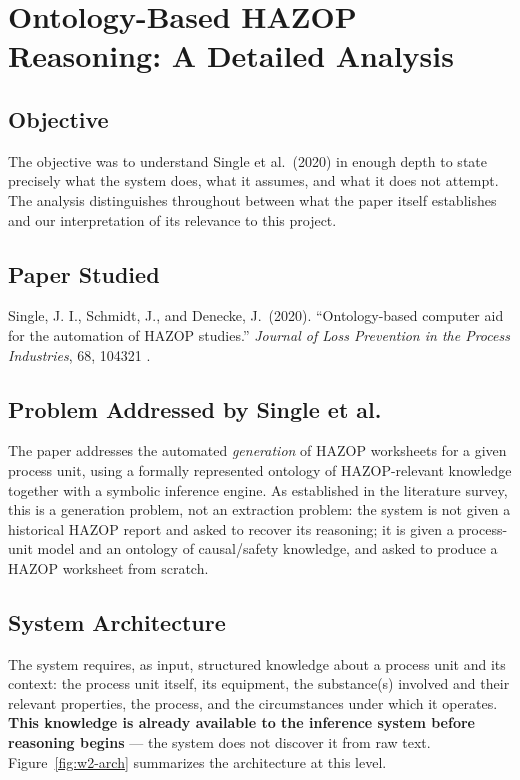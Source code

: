 %

\chapter[Ontology-Based HAZOP Reasoning]{Ontology-Based HAZOP Reasoning: A Detailed Analysis}

\section{Objective}
The objective was to understand Single et al.\ (2020) in enough depth to state precisely what the system does, what it assumes, and what it does not attempt. The analysis distinguishes throughout between what the paper itself establishes and our interpretation of its relevance to this project.

\section{Paper Studied}
Single, J. I., Schmidt, J., and Denecke, J.\ (2020). ``Ontology-based computer aid for the automation of HAZOP studies.'' \emph{Journal of Loss Prevention in the Process Industries}, 68, 104321 \cite{single2020ontologyhazop}.

\section{Problem Addressed by Single et al.}
The paper addresses the automated \emph{generation} of HAZOP worksheets for a given process unit, using a formally represented ontology of HAZOP-relevant knowledge together with a symbolic inference engine. As established in the literature survey, this is a generation problem, not an extraction problem: the system is not given a historical HAZOP report and asked to recover its reasoning; it is given a process-unit model and an ontology of causal/safety knowledge, and asked to produce a HAZOP worksheet from scratch.

\section{System Architecture}
The system requires, as input, structured knowledge about a process unit and its context: the process unit itself, its equipment, the substance(s) involved and their relevant properties, the process, and the circumstances under which it operates. \textbf{This knowledge is already available to the inference system before reasoning begins} --- the system does not discover it from raw text. Figure~\ref{fig:w2-arch} summarizes the architecture at this level.

